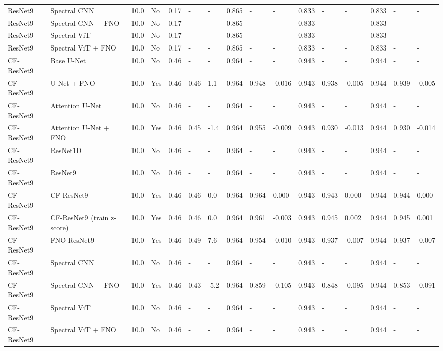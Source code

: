 \begin{longtable}{llllllllllllllll}
ResNet9 & Spectral CNN & 10.0 & No & 0.17 & - & - & 0.865 & - & - & 0.833 & - & - & 0.833 & - & - \\
ResNet9 & Spectral CNN + FNO & 10.0 & No & 0.17 & - & - & 0.865 & - & - & 0.833 & - & - & 0.833 & - & - \\
ResNet9 & Spectral ViT & 10.0 & No & 0.17 & - & - & 0.865 & - & - & 0.833 & - & - & 0.833 & - & - \\
ResNet9 & Spectral ViT + FNO & 10.0 & No & 0.17 & - & - & 0.865 & - & - & 0.833 & - & - & 0.833 & - & - \\
CF-ResNet9 & Base U-Net & 10.0 & No & 0.46 & - & - & 0.964 & - & - & 0.943 & - & - & 0.944 & - & - \\
CF-ResNet9 & U-Net + FNO & 10.0 & Yes & 0.46 & 0.46 & 1.1 & 0.964 & 0.948 & -0.016 & 0.943 & 0.938 & -0.005 & 0.944 & 0.939 & -0.005 \\
CF-ResNet9 & Attention U-Net & 10.0 & No & 0.46 & - & - & 0.964 & - & - & 0.943 & - & - & 0.944 & - & - \\
CF-ResNet9 & Attention U-Net + FNO & 10.0 & Yes & 0.46 & 0.45 & -1.4 & 0.964 & 0.955 & -0.009 & 0.943 & 0.930 & -0.013 & 0.944 & 0.930 & -0.014 \\
CF-ResNet9 & ResNet1D & 10.0 & No & 0.46 & - & - & 0.964 & - & - & 0.943 & - & - & 0.944 & - & - \\
CF-ResNet9 & ResNet9 & 10.0 & No & 0.46 & - & - & 0.964 & - & - & 0.943 & - & - & 0.944 & - & - \\
CF-ResNet9 & CF-ResNet9 & 10.0 & Yes & 0.46 & 0.46 & 0.0 & 0.964 & 0.964 & 0.000 & 0.943 & 0.943 & 0.000 & 0.944 & 0.944 & 0.000 \\
CF-ResNet9 & CF-ResNet9 (train z-score) & 10.0 & Yes & 0.46 & 0.46 & 0.0 & 0.964 & 0.961 & -0.003 & 0.943 & 0.945 & 0.002 & 0.944 & 0.945 & 0.001 \\
CF-ResNet9 & FNO-ResNet9 & 10.0 & Yes & 0.46 & 0.49 & 7.6 & 0.964 & 0.954 & -0.010 & 0.943 & 0.937 & -0.007 & 0.944 & 0.937 & -0.007 \\
CF-ResNet9 & Spectral CNN & 10.0 & No & 0.46 & - & - & 0.964 & - & - & 0.943 & - & - & 0.944 & - & - \\
CF-ResNet9 & Spectral CNN + FNO & 10.0 & Yes & 0.46 & 0.43 & -5.2 & 0.964 & 0.859 & -0.105 & 0.943 & 0.848 & -0.095 & 0.944 & 0.853 & -0.091 \\
CF-ResNet9 & Spectral ViT & 10.0 & No & 0.46 & - & - & 0.964 & - & - & 0.943 & - & - & 0.944 & - & - \\
CF-ResNet9 & Spectral ViT + FNO & 10.0 & No & 0.46 & - & - & 0.964 & - & - & 0.943 & - & - & 0.944 & - & - \\

\end{longtable}

